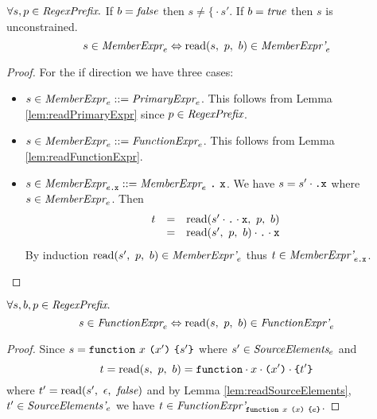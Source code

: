 \documentclass[onecolumn]{sigplanconf-onecolumn}
\begin{document}
\begin{lemma}\mbox{}

  \( \forall s, p \in \textit{RegexPrefix}. \)
  If \( b = \textit{false} \) then \( s \not = \texttt{\{} \cdot s' \). If \(
  b = \textit{true} \) then \( s \) is unconstrained.
  \[
  s \in \textit{MemberExpr}_{e} \Leftrightarrow 
  \textrm{read}(s,~p,~b) \in \textit{MemberExpr'}_{e} 
  \]
\end{lemma}
\begin{proof}
  For the if direction we have three cases:
  \begin{itemize}
  \item \( s \in \textit{MemberExpr}_{e} ::=
    \textit{PrimaryExpr}_{e} \). This follows from Lemma
    \ref{lem:readPrimaryExpr} since \( p \in \textit{RegexPrefix} \).
    
  \item \( s \in \textit{MemberExpr}_{e} ::=
    \textit{FunctionExpr}_{e} \). This follows from Lemma
    \ref{lem:readFunctionExpr}.
    
  \item \( s \in \textit{MemberExpr}_{e\texttt{.\texttt{x}}} ::=
    \textit{MemberExpr}_{e} ~\texttt{.}~\texttt{x} \). We have 
    \( s = s' \cdot \texttt{.} \texttt{x} \) where \( s \in
    \textit{MemberExpr}_{e} \). Then
    \[
    \begin{array}{rcl}
      t &=& \textrm{read}(s' \cdot \texttt{.} \cdot \texttt{x},~p,~b)
      \\
      &=& \textrm{read}(s',~p,~b) \cdot \texttt{.} \cdot \texttt{x}
    \end{array}
    \]
    By induction \( \textrm{read}(s',~p,~b) \in \textit{MemberExpr'}_{e}
    \) thus \( t \in \textit{MemberExpr'}_{e\texttt{.\texttt{x}}} \).
  \end{itemize}
\end{proof}

\begin{lemma}\mbox{}

  \( \forall s, b, p \in \textit{RegexPrefix}. \)
  \[
  s \in \textit{FunctionExpr}_{e} \Leftrightarrow 
  \textrm{read}(s,~p,~b) \in \textit{FunctionExpr'}_{e} 
  \]
\end{lemma}
\begin{proof}
  Since \( s = \texttt{function}~x~\texttt{(}x'\texttt{)}~\texttt{\{}s'\texttt{\}} \) where
  \( s' \in \textit{SourceElements}_{e} \) and 
  \[ 
  t = \textrm{read}(s,~p,~b) = 
  \texttt{function} \cdot x \cdot \texttt{(}x'\texttt{)} \cdot \texttt{\{}t'\texttt{\}}
  \]
  where \( t' = \textrm{read}(s',~\epsilon,~\textit{false}) \) and by Lemma
  \ref{lem:readSourceElements}, \( t' \in \textit{SourceElements'}_{e}
  \) we have \( t \in \textit{FunctionExpr'}_{\texttt{function}~x~\texttt{(}x\texttt{)}~\texttt{\{}e\texttt{\}}} \).
\end{proof}
\end{document}
